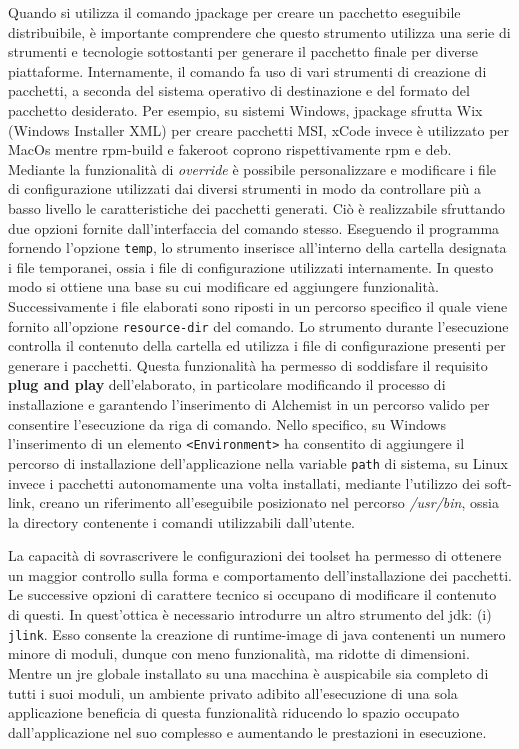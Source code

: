 Quando si utilizza il comando jpackage per creare un pacchetto eseguibile distribuibile, è importante comprendere che questo strumento utilizza una serie di strumenti e tecnologie sottostanti per generare il pacchetto finale per diverse piattaforme. Internamente, il comando fa uso di vari strumenti di creazione di pacchetti, a seconda del sistema operativo di destinazione e del formato del pacchetto desiderato. Per esempio, su sistemi Windows, jpackage sfrutta Wix (Windows Installer XML) per creare pacchetti MSI, xCode invece è utilizzato per MacOs mentre rpm-build e fakeroot coprono rispettivamente rpm e deb. Mediante la funzionalità di \textit{override} è possibile personalizzare e modificare i file di configurazione utilizzati dai diversi strumenti in modo da controllare più a basso livello le caratteristiche dei pacchetti generati. Ciò è realizzabile sfruttando due opzioni fornite dall'interfaccia del comando stesso. Eseguendo il programma fornendo l'opzione \texttt{temp}, lo strumento inserisce all'interno della cartella designata i file temporanei, ossia i file di configurazione utilizzati internamente. In questo modo si ottiene una base su cui modificare ed aggiungere funzionalità. Successivamente i file elaborati sono riposti in un percorso specifico il quale viene fornito all'opzione \texttt{resource-dir} del comando. Lo strumento durante l'esecuzione controlla il contenuto della cartella ed utilizza i file di configurazione presenti per generare i pacchetti. Questa funzionalità ha permesso di soddisfare il requisito \textbf{plug and play} dell'elaborato, in particolare modificando il processo di installazione e garantendo l'inserimento di Alchemist in un percorso valido per consentire l'esecuzione da riga di comando. Nello specifico, su Windows l'inserimento di un elemento \texttt{<Environment>} ha consentito di aggiungere il percorso di installazione dell'applicazione nella variable \texttt{path} di sistema, su Linux invece i pacchetti autonomamente una volta installati, mediante l'utilizzo dei soft-link, creano un riferimento all'eseguibile posizionato nel percorso \textit{/usr/bin}, ossia la directory contenente i comandi utilizzabili dall'utente.

La capacità di sovrascrivere le configurazioni dei toolset ha permesso di ottenere un maggior controllo sulla forma e comportamento dell'installazione dei pacchetti. Le successive opzioni di carattere tecnico si occupano di modificare il contenuto di questi. In quest'ottica è necessario introdurre un altro strumento del \ac{jdk}: (i) \texttt{jlink}. Esso consente la creazione di runtime-image di java contenenti un numero minore di moduli, dunque con meno funzionalità, ma ridotte di dimensioni. Mentre un \ac{jre} globale installato su una macchina è auspicabile sia completo di tutti i suoi moduli, un ambiente privato adibito all'esecuzione di una sola applicazione beneficia di questa funzionalità riducendo lo spazio occupato dall'applicazione nel suo complesso e aumentando le prestazioni in esecuzione. 

